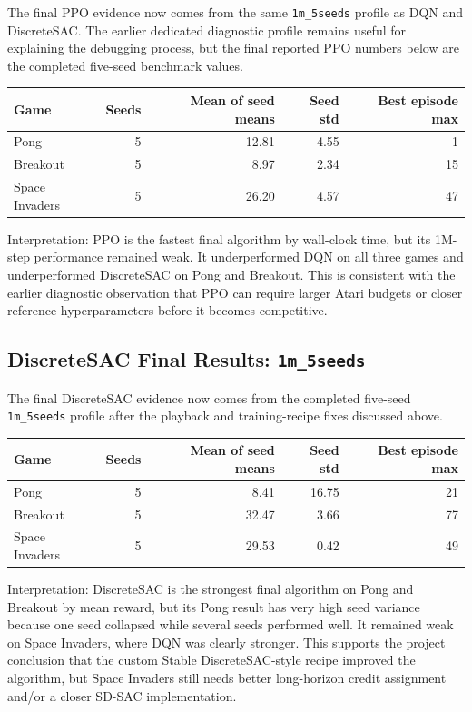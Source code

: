 \documentclass[11pt]{article}
\begin{document}
The final PPO evidence now comes from the same \texttt{1m\_5seeds} profile as DQN and DiscreteSAC. The earlier dedicated diagnostic profile remains useful for explaining the debugging process, but the final reported PPO numbers below are the completed five-seed benchmark values.

\begin{longtable}{L{0.28\textwidth} r r r r}
\toprule
Game & Seeds & Mean of seed means & Seed std & Best episode max \\
\midrule
\endhead
Pong & 5 & -12.81 & 4.55 & -1 \\
Breakout & 5 & 8.97 & 2.34 & 15 \\
Space Invaders & 5 & 26.20 & 4.57 & 47 \\
\bottomrule
\end{longtable}

Interpretation: PPO is the fastest final algorithm by wall-clock time, but its 1M-step performance remained weak. It underperformed DQN on all three games and underperformed DiscreteSAC on Pong and Breakout. This is consistent with the earlier diagnostic observation that PPO can require larger Atari budgets or closer reference hyperparameters before it becomes competitive.

\subsection*{DiscreteSAC Final Results: \texttt{1m\_5seeds}}

The final DiscreteSAC evidence now comes from the completed five-seed \texttt{1m\_5seeds} profile after the playback and training-recipe fixes discussed above.

\begin{longtable}{L{0.28\textwidth} r r r r}
\toprule
Game & Seeds & Mean of seed means & Seed std & Best episode max \\
\midrule
\endhead
Pong & 5 & 8.41 & 16.75 & 21 \\
Breakout & 5 & 32.47 & 3.66 & 77 \\
Space Invaders & 5 & 29.53 & 0.42 & 49 \\
\bottomrule
\end{longtable}

Interpretation: DiscreteSAC is the strongest final algorithm on Pong and Breakout by mean reward, but its Pong result has very high seed variance because one seed collapsed while several seeds performed well. It remained weak on Space Invaders, where DQN was clearly stronger. This supports the project conclusion that the custom Stable DiscreteSAC-style recipe improved the algorithm, but Space Invaders still needs better long-horizon credit assignment and/or a closer SD-SAC implementation.
\end{document}

